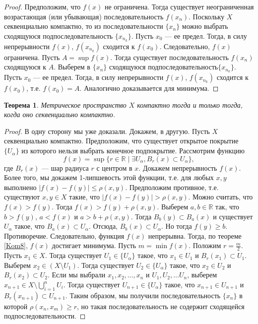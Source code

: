 \documentclass[12pt, titlepage, oneside]{amsbook}
\newcommand{\RR}{\mathbb{R}}
\newtheorem{theorem}{Теорема}[chapter]
\theoremstyle{definition}
\theoremstyle{remark}
\begin{document}
\begin{proof}
Предположим, что $f(x)$ не ограничена. Тогда существует неограниченная возрастающая (или убывающая) последовательность $f(x_n)$. Поскольку $X$ секвенциально компактно, то из последовательности $\{x_n\}$ можно выбрать сходящуюся подпоследовательность $\{x_{n_k}\}$. Пусть $x_0$ --- ее предел. Тогда, в силу непрерывности $f(x)$, $f(x_{n_k})$ сходится к $f(x_0)$. Следовательно, $f(x)$ ограничена. Пусть $A=\sup f(x)$. Тогда существует последовательность $f(x_n)$ сходящуюся к $A$. Выберем в $\{x_n\}$ сходящуюся подпоследовательность$\{x_{n_k}\}$. Пусть $x_0$ --- ее предел. Тогда, в силу непрерывности $f(x)$, $f(x_{n_k})$ сходится к $f(x_0)$, т.е. $f(x_0)=A$. Аналогично доказывается для минимума.
\end{proof}

\begin{theorem}
\label{Kom9}
Метрическое пространство $X$ компактно тогда и только тогда, когда оно секвенциально компактно.
\end{theorem}

\begin{proof}
В одну сторону мы уже доказали. Докажем, в другую. Пусть $X$ секвенциально компактно. Предположим, что существует открытое покрытие $\{U_{\alpha}\}$ из которого нельзя выбрать конечное подпокрытие. Рассмотрим функцию $$f(x)=\sup\{r\in\RR\mid\exists U_{\alpha},  B_r(x)\subset U_{\alpha}\},$$ где $B_r(x)$ --- шар радиуса $r$ с центром в $x$. Докажем непрерывность $f(x)$. Более того, мы докажем 1-липшевость этой функции, т.е. для любых $x,y$ выполнено $|f(x)-f(y)|\leq\rho(x,y)$. Предположим противное, т.е. существуют $x,y\in X$ такие, что $|f(x)-f(y)|>\rho(x,y)$. Можно считать, что $f(x)>f(y)$. Тогда $f(x)>f(y)+\rho(x,y)$. Выберем $a,b\in\RR$ так, что $b>f(y)$, $a<f(x)$ и $a>b+\rho(x,y)$. Тогда $B_b(y)\subset B_a(x)$ и существует $U_{\alpha}$  такое, что $B_a(x)\subset U_{\alpha}$. Отсюда, $B_b(x)\subset U_{\alpha}$. Но тогда $f(y)\geq b$. Противоречие. Следовательно, функция $f(x)$ непрерывна. Тогда, по теореме \ref{Kom8}, $f(x)$ достигает минимума. Пусть $m=\min f(x)$. Положим $r=\frac{m}{2}$. Пусть $x_1\in X$. Тогда существует $U_1\in\{U_{\alpha}\}$ такое, что $x_1\in U_1$ и $B_r(x_1)\subset U_1$. Выберем $x_2\in(X\setminus U_1)$. Тогда существует $U_2\in\{U_{\alpha}\}$ такое, что $x_2\in U_2$ и $B_r(x_2)\subset U_2$. Если мы выбрали $x_1,x_2,\ldots,x_n$ и $U_1,U_2,\ldots U_n$, выберем $x_{n+1}\in X\setminus\bigcup\limits_{i=1}^n U_i$. Тогда существует $U_{n+1}\in\{U_{\alpha}\}$ такое, что $x_{n+1}\in U_{n+1}$ и $B_r(x_{n+1})\subset U_{n+1}$. Таким образом, мы получили последовательность $\{x_n\}$ в которой $\rho(x_n,x_m)\geq r$, но такая последовательность не содержит сходящейся подпоследовательности.
\end{proof}
\end{document}
